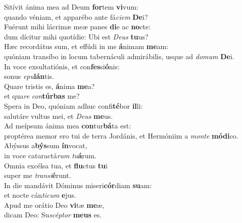 \evenverse Sitívit ánima mea ad Deum \textbf{for}tem \textbf{vi}vum:~\*\\
\evenverse quando véniam, et apparébo ante fá\textit{ci}\textit{em} \textbf{De}i?\\
\oddverse Fuérunt mihi lácrimæ meæ panes \textbf{di}e ac \textbf{no}cte:~\*\\
\oddverse dum dícitur mihi quotídie: Ubi est \textit{De}\textit{us} \textbf{tu}us?\\
\evenverse Hæc recordátus sum, et effúdi in me \textbf{á}nimam \textbf{me}am:~\*\\
\evenverse quóniam transíbo in locum tabernáculi admirábilis, usque ad \textit{do}\textit{mum} \textbf{De}i.\\
\oddverse In voce exsultatiónis, et con\textbf{fes}si\textbf{ó}nis:~\*\\
\oddverse sonus \textit{e}\textit{pu}\textbf{lán}tis.\\
\evenverse Quare tristis es, \textbf{á}nima \textbf{me}a?~\*\\
\evenverse et qua\textit{re} \textit{con}\textbf{túr}\textbf{bas} me?\\
\oddverse Spera in Deo, quóniam adhuc confi\textbf{té}bor \textbf{il}li:~\*\\
\oddverse salutáre vultus mei, et \textit{De}\textit{us} \textbf{me}us.\\
\evenverse Ad meípsum ánima mea \textbf{con}tur\textbf{bá}ta est:~\*\\
\evenverse proptérea memor ero tui de terra Jordánis, et Hermóniim a \textit{mon}\textit{te} \textbf{mó}\textbf{di}co.\\
\oddverse Abýssus a\textbf{býs}sum \textbf{ín}vocat,~\*\\
\oddverse in voce cataractá\textit{rum} \textit{tu}\textbf{á}rum.\\
\evenverse Omnia excélsa tua, et \textbf{flu}ctus \textbf{tu}i~\*\\
\evenverse super me \textit{tran}\textit{si}\textbf{é}runt.\\
\oddverse In die mandávit Dóminus miseri\textbf{cór}diam \textbf{su}am:~\*\\
\oddverse et nocte cán\textit{ti}\textit{cum} \textbf{e}jus.\\
\evenverse Apud me orátio Deo \textbf{vi}tæ \textbf{me}æ,~\*\\
\evenverse dicam Deo: Su\textit{scép}\textit{tor} \textbf{me}\textbf{us} es.\\
